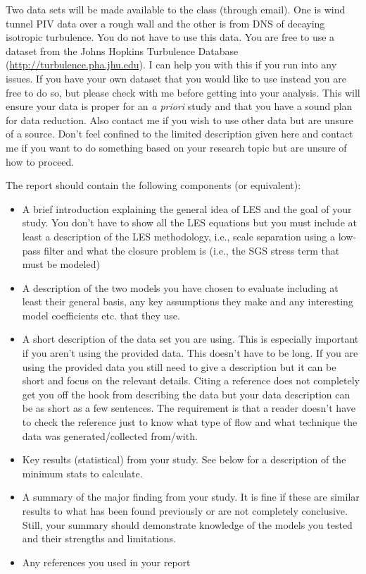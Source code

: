 \documentclass[11pt]{article}
\begin{document}
Two data sets will be made available to the class (through email).  One is wind tunnel PIV data over a rough wall and the other is from DNS of decaying isotropic turbulence. You do not have to use this data. You are free to use a dataset from the Johns Hopkins Turbulence Database (\url{http://turbulence.pha.jhu.edu}). I can help you with this if you run into any issues. If you have your own dataset that you would like to use instead you are free to do so, but please check with me before getting into your analysis.  This will ensure your data is proper for an {\it a priori} study and that you have a sound plan for data reduction. Also contact me if you wish to use other data but are unsure of a source. Don't feel confined to the limited description given here and contact me if you want to do something based on your research topic but are unsure of how to proceed. 

\noindent The report should contain the following components (or equivalent):
\begin{itemize}

\item A brief introduction explaining the general idea of LES and the goal of your study. You don't have to show all the LES equations but you must include at least a description of the LES methodology, i.e., scale separation using a low-pass filter and what the closure problem is (i.e., the SGS stress term that must be modeled)

\item A description of the two models you have chosen to evaluate including at least their general basis, any key assumptions they make and any interesting model coefficients etc. that they use.

\item A short description of the data set you are using.  This is especially important if you aren't using the provided data.  This doesn't have to be long.  If you are using the provided data you still need to give a description but it can be short and focus on the relevant details. Citing a reference does not completely get you off the hook from describing the data but your data description can be as short as a few sentences.  The requirement is that a reader doesn't have to check the reference just to know what type of flow and what technique the data was generated/collected from/with.

\item Key results (statistical) from your study.  See below for a description of the minimum stats to
calculate.

\item A summary of the major finding from your study.  It is fine if these are similar results to what
has been found previously or are not completely conclusive.  Still, your summary should demonstrate 
knowledge of the models you tested and their strengths and limitations.

\item Any references you used in your report

\end{itemize}
\end{document}
